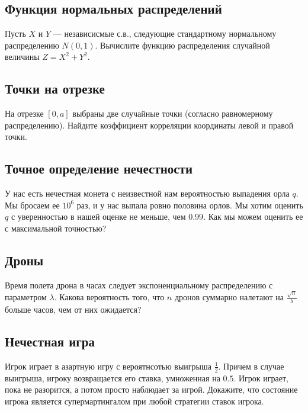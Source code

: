 \documentclass[12pt]{article}
\begin{document}
\subsection{Функция нормальных распределений}

Пусть $X$ и $Y$ --- независисмые с.в., следующие стандартному нормальному распределению $N(0, 1)$. Вычислите функцию распределения случайной величины $Z = X^2 + Y^2$.



\subsection{Точки на отрезке}

На отрезке $[0, a]$ выбраны две случайные точки (согласно равномерному распределению). Найдите коэффициент корреляции координаты левой и правой точки. 



\subsection{Точное определение нечестности}

У нас есть нечестная монета с неизвестной нам вероятностью выпадения орла $q$. Мы бросаем ее $10^6$ раз, и у нас выпала ровно половина орлов. Мы хотим оценить $q$ с уверенностью в нашей оценке не меньше, чем $0.99$. Как мы можем оценить ее с максимальной точностью? 



\subsection{Дроны}

Время полета дрона в часах следует экспоненциальному распределению с параметром $\lambda$. Какова вероятность того, что $n$ дронов суммарно налетают на $\frac{\sqrt{n}}{\lambda}$ больше часов, чем от них ожидается?



\subsection{Нечестная игра}

Игрок играет в азартную игру с вероятнсотью выигрыша $\frac{1}{2}$. Причем в случае выигрыша, игроку возвращается его ставка, умноженная на $0.5$. Игрок играет, пока не разорится, а потом просто наблюдает за игрой. Докажите, что состояние игрока является супермартингалом при любой стратегии ставок игрока.
\end{document}
